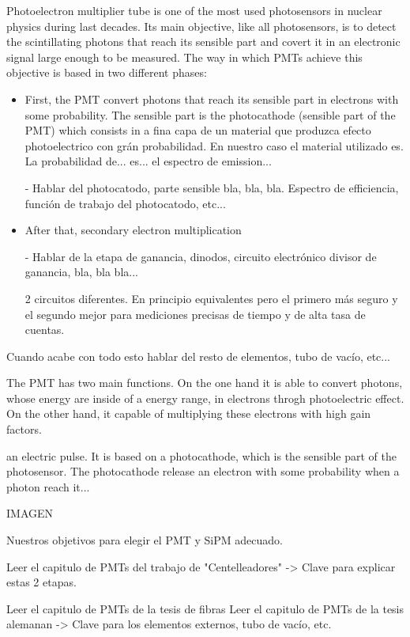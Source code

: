 Photoelectron multiplier tube is one of the most used photosensors in nuclear physics during last decades. Its main objective, like all photosensors, is to detect the scintillating photons that reach its sensible part and covert it in an electronic signal large enough to be measured. The way in which PMTs achieve this objective is based in two different phases:

\begin{itemize}
\item{} First, the PMT convert photons that reach its sensible part in electrons with some probability. The sensible part is the photocathode (sensible part of the PMT) which consists in a fina capa de un material que produzca efecto photoelectrico con grán probabilidad. En nuestro caso el material utilizado es. La probabilidad de... es... el espectro de emission...  

- Hablar del photocatodo, parte sensible bla, bla, bla. Espectro de efficiencia, función de trabajo del photocatodo, etc...

\item{} After that, secondary electron multiplication

- Hablar de la etapa de ganancia, dinodos, circuito electrónico divisor de ganancia, bla, bla bla...

2 circuitos diferentes. En principio equivalentes pero el primero más seguro y el segundo mejor para mediciones precisas de tiempo y de alta tasa de cuentas.

\end{itemize}


Cuando acabe con todo esto hablar del resto de elementos, tubo de vacío, etc...


The PMT has two main functions. On the one hand it is able to convert photons, whose energy are inside of a energy range, in electrons throgh photoelectric effect. On the other hand, it capable of multiplying these electrons with high gain factors.


an electric pulse. It is based on a photocathode, which is the sensible part of the photosensor. The photocathode release an electron with some probability when a photon reach it...

IMAGEN

Nuestros objetivos para elegir el PMT y SiPM adecuado.

Leer el capitulo de PMTs del trabajo de "Centelleadores" -> Clave para explicar estas 2 etapas.

Leer el capitulo de PMTs de la tesis de fibras
Leer el capitulo de PMTs de la tesis alemanan -> Clave para los elementos externos, tubo de vacío, etc.



